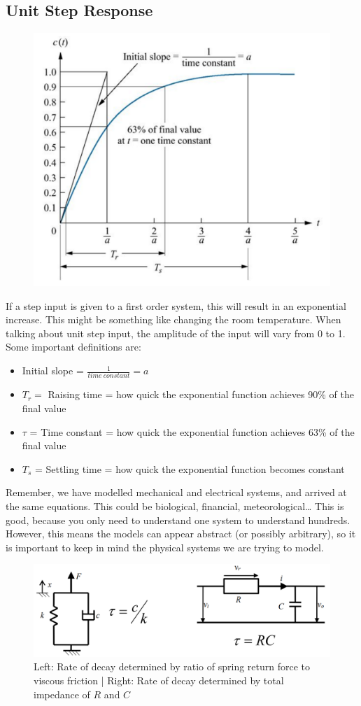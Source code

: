\documentclass[class=report, crop=false, 12pt,a4paper]{standalone}
\begin{document}
\subsection{Unit Step Response}
\begin{figure}[H]
  \centering
  \includegraphics[width = 0.65 \textwidth]{../img/graphs7.PNG}
\end{figure}
If a step input is given to a first order system, this will result in an exponential increase. This might be something like changing the room temperature. When talking about unit step input, the amplitude of the input will vary from 0 to 1. Some important definitions are:
\begin{itemize}
  \item Initial slope = $\frac{1}{time \ constant} = a$ 
  \item $T_r =$ Raising time = how quick the exponential function achieves 90\% of the final value
  \item $\tau$ = Time constant = how quick the exponential function achieves 63\% of the final value
  \item $T_s$ = Settling time = how quick the exponential function becomes constant
\end{itemize}
Remember, we have modelled mechanical and electrical systems, and arrived at the same equations. This could be biological, financial, meteorological… This is good, because you only need to understand one system to understand hundreds. However, this means the models can appear abstract (or possibly arbitrary), so it is important to keep in mind the physical systems we are trying to model. 
\begin{figure}[H]
  \centering
  \includegraphics[width = 0.9 \textwidth]{../img/blockdiagram19.png}
  \caption{Left: Rate of decay determined by ratio of spring return force to viscous friction | Right: Rate of decay determined by total impedance of $R$ and $C$}
\end{figure}
\end{document}
